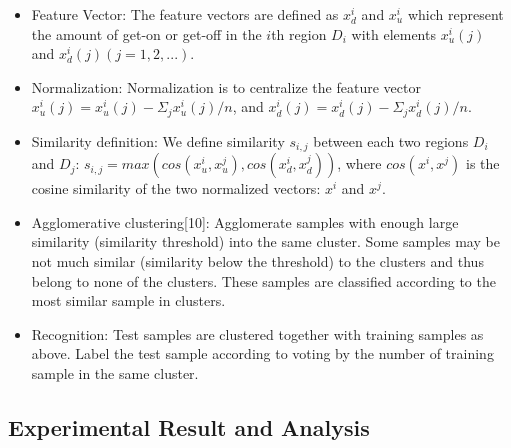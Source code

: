 \documentclass[a4paper, 10pt, conference]{ieeeconf}      %
\begin{document}
\begin{itemize}

\item Feature Vector: The feature vectors are defined as $ x^{i}_{d} $ and $ x^{i}_{u} $ which represent the amount of get-on or get-off in the $i$th region $D_i$ with elements $ x^{i}_{u}(j) $ and $ x^{i}_{d}(j) (j=1,2,...) $.
\item Normalization: Normalization is to centralize the feature vector $ x^{i}_{u}(j)=x^{i}_{u}(j)-\Sigma_{j}x^{i}_{u}(j)/n $, and $ x^{i}_{d}(j)=x^{i}_{d}(j)-\Sigma_{j}x^{i}_{d}(j)/n $.
\item Similarity definition: We define similarity $ s_{i,j} $ between each two regions $ D_i $ and $ D_j $: $ s_{i,j}=max(cos(x^{i}_{u},x^{j}_{u}),cos(x^{i}_{d},x^{j}_{d})) $, where $ cos(x^i,x^j) $ is the cosine similarity of the two normalized vectors: $ x^i $ and $ x^j $.
\item Agglomerative clustering[10]: Agglomerate samples with enough large similarity (similarity threshold) into the same cluster. Some samples may be not much similar (similarity below the threshold) to the clusters and thus belong to none of the clusters. These samples are classified according to the most similar sample in clusters.
\item Recognition: Test samples are clustered together with training samples as above. Label the test sample according to voting by the number of training sample in the same cluster.

\end{itemize}

\subsection{Experimental Result and Analysis}
\end{document}
